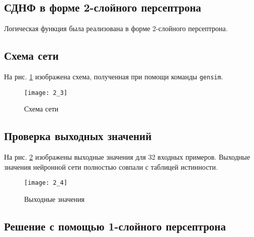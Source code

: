 
\subsection{СДНФ в форме 2-слойного персептрона}


Логическая функция была реализована в форме 2-слойного персептрона. 

\subsection{Схема сети}



На рис. \ref{fig:2_3} изображена схема, полученная при помощи команды \verb+gensim+.

\begin{figure}[H]
\begin{center}
	\texttt{[image: 2\_3]}
	\caption{Схема сети}
	\label{fig:2_3}
\end{center}
\end{figure}

\newpage

\subsection{Проверка выходных значений}


На рис. \ref{fig:2_4} изображены выходные значения для 32 входных примеров. Выходные значения нейронной сети полностью совпали с таблицей истинности.

\begin{figure}[H]
\begin{center}
	\texttt{[image: 2\_4]}
	\caption{Выходные значения}
	\label{fig:2_4}
\end{center}
\end{figure}

\subsection{Решение с помощью 1-слойного персептрона}



